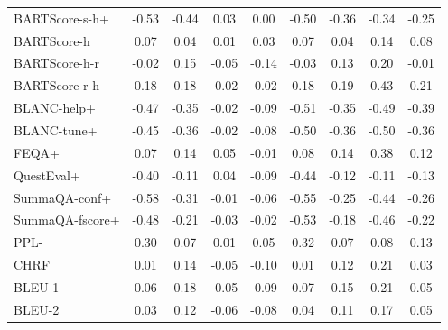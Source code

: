 \begin{table}
{\begin{tabular}{l|cc|cc|cc|cc}
BARTScore-s-h+   & -0.53 & -0.44                  & 0.03  & 0.00                     & -0.50 & -0.36                & -0.34 & -0.25                  \\
BARTScore-h      & 0.07  & 0.04                   & 0.01  & 0.03                     & 0.07  & 0.04                 & 0.14  & 0.08                   \\
BARTScore-h-r    & -0.02 & 0.15                   & -0.05 & -0.14                    & -0.03 & 0.13                 & 0.20  & -0.01                  \\
BARTScore-r-h    & 0.18  & 0.18                   & -0.02 & -0.02                    & 0.18  & 0.19                 & 0.43  & 0.21                   \\
BLANC-help+      & -0.47 & -0.35                  & -0.02 & -0.09                    & -0.51 & -0.35                & -0.49 & -0.39                  \\
BLANC-tune+      & -0.45 & -0.36                  & -0.02 & -0.08                    & -0.50 & -0.36                & -0.50 & -0.36                  \\
FEQA+            & 0.07  & 0.14                   & 0.05  & -0.01                    & 0.08  & 0.14                 & 0.38  & 0.12                   \\
QuestEval+       & -0.40 & -0.11                  & 0.04  & -0.09                    & -0.44 & -0.12                & -0.11 & -0.13                  \\
SummaQA-conf+    & -0.58 & -0.31                  & -0.01 & -0.06                    & -0.55 & -0.25                & -0.44 & -0.26                  \\
SummaQA-fscore+  & -0.48 & -0.21                  & -0.03 & -0.02                    & -0.53 & -0.18                & -0.46 & -0.22                  \\
PPL-             & 0.30  & 0.07                   & 0.01  & 0.05                     & 0.32  & 0.07                 & 0.08  & 0.13                   \\
CHRF             & 0.01  & 0.14                   & -0.05 & -0.10                    & 0.01  & 0.12                 & 0.21  & 0.03                   \\
BLEU-1           & 0.06  & 0.18                   & -0.05 & -0.09                    & 0.07  & 0.15                 & 0.21  & 0.05                   \\
BLEU-2           & 0.03  & 0.12                   & -0.06 & -0.08                    & 0.04  & 0.11                 & 0.17  & 0.05                   \\

\end{tabular}}
\end{table}
